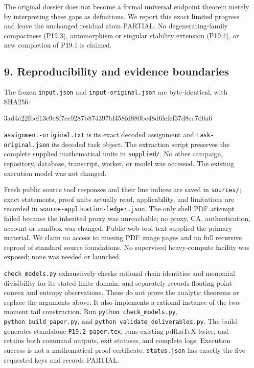 \documentclass[
  11pt,
]{article}
\newenvironment{Shaded}{}{}
\newcommand{\NormalTok}[1]{#1}
\begin{document}
The original dossier does not become a formal universal endpoint theorem
merely by interpreting these gaps as definitions. We report this exact
limited progress and leave the unchanged residual atom PARTIAL. No
degenerating-family compactness (P19.3), automorphism or singular
stability extension (P19.4), or new completion of P19.1 is claimed.

\subsection{9. Reproducibility and evidence
boundaries}\label{reproducibility-and-evidence-boundaries}

The frozen \texttt{input.json} and \texttt{input-original.json} are
byte-identical, with SHA256:

\begin{Shaded}
\begin{Highlighting}[]
\NormalTok{3ad4e22fbef13e9e8f7ec9287b874397bf458fd880bc48d6fefef37d8cc7d0a6}
\end{Highlighting}
\end{Shaded}

\texttt{assignment-original.txt} is its exact decoded assignment and
\texttt{task-original.json} its decoded task object. The extraction
script preserves the complete supplied mathematical units in
\texttt{supplied/}. No other campaign, repository, database, transcript,
worker, or model was accessed. The existing execution model was not
changed.

Fresh public source tool responses and their line indices are saved in
\texttt{sources/}; exact statements, proof units actually read,
applicability, and limitations are recorded in
\texttt{source-application-ledger.json}. The only shell PDF attempt
failed because the inherited proxy was unreachable; no proxy, CA,
authentication, account or sandbox was changed. Public web-tool text
supplied the primary material. We claim no access to missing PDF image
pages and no full recursive reproof of standard source foundations. No
supervised heavy-compute facility was exposed; none was needed or
launched.

\texttt{check\_models.py} exhaustively checks rational chain identities
and monomial divisibility for its stated finite domain, and separately
records floating-point convex and entropy observations. These do not
prove the analytic theorems or replace the arguments above. It also
implements a rational instance of the two-moment tail construction. Run
\texttt{python\ check\_models.py}, \texttt{python\ build\_paper.py}, and
\texttt{python\ validate\_deliverables.py}. The build generates
standalone \texttt{P19.2-paper.tex}, runs existing pdfLaTeX twice, and
retains both command outputs, exit statuses, and complete logs.
Execution success is not a mathematical proof certificate.
\texttt{status.json} has exactly the five requested keys and records
PARTIAL.
\end{document}
